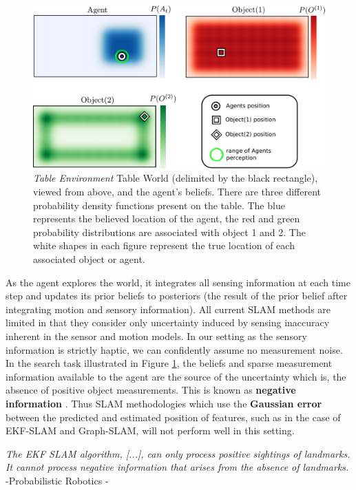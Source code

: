 \begin{figure}
  \centering
  \includegraphics[width=0.95\linewidth]{./ch5-MLMF/Figures/Figure1_v2.pdf}
  \caption{ \textit{Table Environment} Table World (delimited by the black rectangle), viewed from above, and the agent's beliefs. 
  There are three different probability density functions present on the table. 
  The blue represents the believed location of the agent, the red and green probability distributions are associated with object 1 and 2.
  The white shapes in each figure represent the true location of each associated object or agent.}
  \label{fig:Figure1}
\end{figure}
\vspace*{0.6cm}

As the agent explores the world, it integrates all sensing information at each time step and updates its prior beliefs to posteriors
(the result of the prior belief after integrating motion and sensory information).
All current SLAM methods are limited in that they consider only uncertainty induced by sensing inaccuracy inherent in 
the sensor and motion models. In our setting as the sensory information is strictly haptic, we can confidently assume no measurement noise. 
In the search task illustrated in Figure \ref{fig:Figure1}, the beliefs and sparse measurement information available to the agent are 
the source of the uncertainty which is, the absence of positive object measurements. 
This is known as \textbf{negative information} \cite[p.313]{Thrun_Burgard_Fox_2005} \cite{Thrun02particlefilters,negative_info_markov_localisation}. 
Thus SLAM methodologies which use the \textbf{Gaussian error} between the predicted and estimated position of features, such as in the case 
of EKF-SLAM and Graph-SLAM, will not perform well in this setting. 

{\quote \textit{The EKF SLAM algorithm, [...], can only process positive sightings of landmarks. It cannot process negative information
that arises from the absence of landmarks. } -Probabilistic Robotics \cite[p.313]{Thrun_Burgard_Fox_2005}-}\\[0.01cm]

